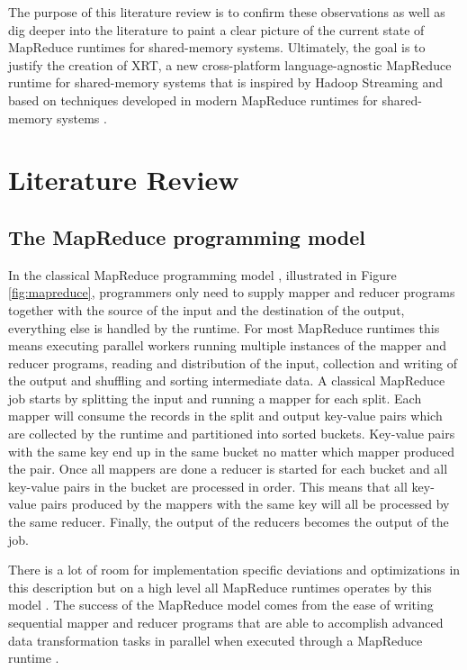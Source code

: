 \documentclass[11pt]{article}       %
\begin{document}
The purpose of this literature review is to confirm these observations as well
as dig deeper into the literature to paint a clear picture of the current state
of MapReduce runtimes for shared-memory systems. Ultimately, the goal is to
justify the creation of XRT, a new cross-platform language-agnostic MapReduce
runtime for shared-memory systems that is inspired by Hadoop Streaming
\cite{HadoopStreaming} and based on techniques developed in modern MapReduce
runtimes for shared-memory systems \cite{Phoenix} \cite{Phoenix++} \cite{CilkMR}
\cite{Ostrich} \cite{Metis}.

\section{Literature Review} \label{litrev}

\subsection{The MapReduce programming model}



In the classical MapReduce programming model \cite{GoogleMapReduce}, illustrated
in Figure \ref{fig:mapreduce}, programmers only need to supply mapper and
reducer programs together with the source of the input and the destination of
the output, everything else is handled by the runtime. For most MapReduce
runtimes this means executing parallel workers running multiple instances of the
mapper and reducer programs, reading and distribution of the input, collection
and writing of the output and shuffling and sorting intermediate data. A
classical MapReduce job starts by splitting the input and running a mapper for
each split. Each mapper will consume the records in the split and output
key-value pairs which are collected by the runtime and partitioned into sorted
buckets. Key-value pairs with the same key end up in the same bucket no matter
which mapper produced the pair. Once all mappers are done a reducer is started
for each bucket and all key-value pairs in the bucket are processed in order.
This means that all key-value pairs produced by the mappers with the same key
will all be processed by the same reducer. Finally, the output of the reducers
becomes the output of the job.

There is a lot of room for implementation specific deviations and optimizations
in this description but on a high level all MapReduce runtimes operates by this
model \cite{GoogleMapReduce} \cite{Hadoop} \cite{Phoenix} \cite{Phoenix++}
\cite{CilkMR} \cite{Metis} \cite{Ostrich}. The success of the MapReduce model
comes from the ease of writing sequential mapper and reducer programs that are
able to accomplish advanced data transformation tasks in parallel when executed
through a MapReduce runtime \cite{GoogleMapReduce}.
\end{document}
